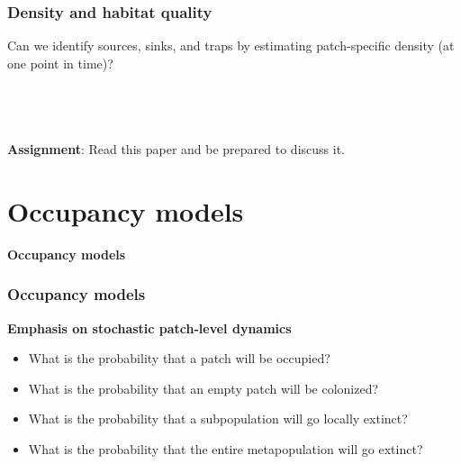\documentclass[color=usenames,dvipsnames]{beamer}\usepackage[]{graphicx}\usepackage[]{xcolor}
\begin{document}
\begin{frame}
  \frametitle{Density and habitat quality}
  Can we identify sources, sinks, and traps by estimating
  patch-specific density (at one point in time)? \\
  \pause
  \vfill
  \begin{columns}
    \wide
    \centering
     \\
  \end{columns}
  \vfill
  \centering
  \large
  \alert{\bf Assignment}: Read this paper and be prepared to discuss it. \\
\end{frame}




\section{Occupancy models}


\begin{frame}[plain]
  \Huge
  \centering
  \vfill
  \bf 
  \color{MidnightBlue}
  Occupancy models \\
  \vfill
\end{frame}


\begin{frame}[fragile]
  \frametitle{Occupancy models}
  \large
  {\bf Emphasis on stochastic patch-level dynamics}
  \begin{itemize}[<+->]
    \item What is the probability that a patch will be occupied?
    \item What is the probability that an empty patch will be colonized?
    \item What is the probability that a subpopulation will go locally extinct?
    \item What is the probability that the entire metapopulation will
      go extinct?
  \end{itemize}
\end{frame}
\end{document}
